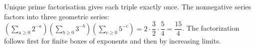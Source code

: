 Unique prime factorisation gives each triple exactly once. The nonnegative series factors into three geometric series: $\left(\sum_{a\ge0}2^{-a}\right)\left(\sum_{b\ge0}3^{-b}\right)\left(\sum_{c\ge0}5^{-c}\right)=2\cdot\dfrac{3}{2}\cdot\dfrac{5}{4}=\boxed{\dfrac{15}{4}}$. The factorization follows first for finite boxes of exponents and then by increasing limits.
